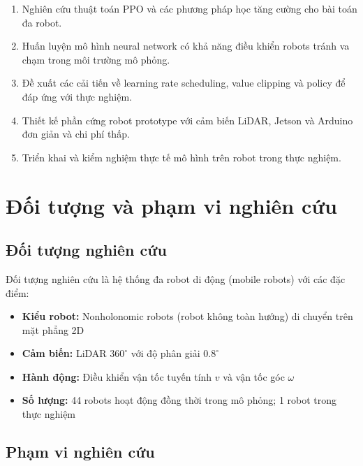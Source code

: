 \begin{enumerate}
    \item Nghiên cứu thuật toán PPO và các phương pháp học tăng cường cho bài toán đa robot.

    \item Huấn luyện mô hình neural network có khả năng điều khiển robots tránh va chạm trong môi trường mô phỏng.

    \item Đề xuất các cải tiến về learning rate scheduling, value clipping và policy để đáp ứng với thực nghiệm.

    \item Thiết kế phần cứng robot prototype với cảm biến LiDAR, Jetson và Arduino đơn giản và chi phí thấp.

    \item Triển khai và kiểm nghiệm thực tế mô hình trên robot trong thực nghiệm.
\end{enumerate}


\section{Đối tượng và phạm vi nghiên cứu}
\label{sec:scope}

\subsection{Đối tượng nghiên cứu}

Đối tượng nghiên cứu là hệ thống đa robot di động (mobile robots) với các đặc điểm:

\begin{itemize}
    \item \textbf{Kiểu robot:} Nonholonomic robots (robot không toàn hướng) di chuyển trên mặt phẳng 2D
    \item \textbf{Cảm biến:} LiDAR $360^\circ$ với độ phân giải $0.8^\circ$
    \item \textbf{Hành động:} Điều khiển vận tốc tuyến tính $v$ và vận tốc góc $\omega$
    \item \textbf{Số lượng:} 44 robots hoạt động đồng thời trong mô phỏng; 1 robot trong thực nghiệm
\end{itemize}

\subsection{Phạm vi nghiên cứu}

